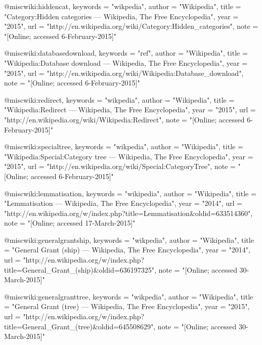 @misc{wiki:hiddencat,
    keywords    =   "wikpedia",
    author      =   "Wikipedia",
    title       =   "Category:Hidden categories --- Wikipedia{,} The Free Encyclopedia",
    year        =   "2015",
    url         =   "http://en.wikipedia.org/wiki/Category:Hidden_categories",
    note        =   "[Online; accessed 6-February-2015]"
}
 
@misc{wiki:databasedownload,
    keywords    =   "ref",
    author      =   "Wikipedia",
    title       =   "Wikipedia:Database download --- Wikipedia{,} The Free Encyclopedia",
    year        =   "2015",
    url         =   "http://en.wikipedia.org/wiki/Wikipedia:Database_download",
    note        =   "[Online; accessed 6-February-2015]"
}

@misc{wiki:redirect,
    keywords    =   "wikpedia",
    author      =   "Wikipedia",
    title       =   "Wikipedia:Redirect --- Wikipedia{,} The Free Encyclopedia",
    year        =   "2015",
    url         =   "http://en.wikipedia.org/wiki/Wikipedia:Redirect",
    note        =   "[Online; accessed 6-February-2015]"
}
 
@misc{wiki:specialtree,
    keywords    =   "wikpedia",
    author = "Wikipedia",
    title = "Wikipedia:Special:Category tree --- Wikipedia{,} The Free Encyclopedia",
    year = "2015",
    url = "http://en.wikipedia.org/wiki/Special:CategoryTree",
    note = "[Online; accessed 6-February-2015]"
}
 
@misc{wiki:lemmatisation,
    keywords    =   "wikipedia",
    author      =   "Wikipedia",
    title       =   "Lemmatisation --- Wikipedia{,} The Free Encyclopedia",
    year        =   "2014",
    url         =   "http://en.wikipedia.org/w/index.php?title=Lemmatisation&oldid=633514360",
    note        =   "[Online; accessed 17-March-2015]"
}
 
@misc{wiki:generalgrantship,
    keywords    =   "wikpedia",
    author      =   "Wikipedia",
    title       =   "General Grant (ship) --- Wikipedia{,} The Free Encyclopedia",
    year        =   "2014",
    url         =   "http://en.wikipedia.org/w/index.php?title=General_Grant_(ship)&oldid=636197325",
    note        =   "[Online; accessed 30-March-2015]"
}
 
@misc{wiki:generalgranttree,
    keywords    =   "wikpedia",
    author      =   "Wikipedia",
    title       =   "General Grant (tree) --- Wikipedia{,} The Free Encyclopedia",
    year        =   "2015",
    url         =   "http://en.wikipedia.org/w/index.php?title=General_Grant_(tree)&oldid=645508629",
    note        =   "[Online; accessed 30-March-2015]"
}
 

